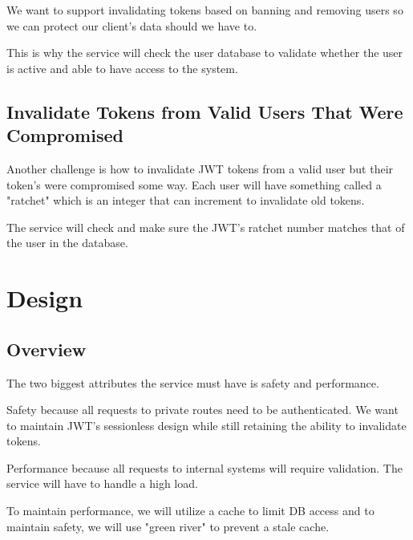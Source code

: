 \documentclass[11pt]{article}
\begin{document}
We want to support invalidating tokens based on banning and removing users so
we can protect our client's data should we have to.

This is why the service will check the user database to validate whether the
user is active and able to have access to the system.

\subsection{Invalidate Tokens from Valid Users That Were Compromised}

Another challenge is how to invalidate JWT tokens from a valid user but their
token's were compromised some way. Each user will have something called a "ratchet"
which is an integer that can increment to invalidate old tokens.

The service will check and make sure the JWT's ratchet number matches that of
the user in the database.

\section{Design}

\subsection{Overview}

The two biggest attributes the service must have is safety and performance.

Safety because all requests to private routes need to be authenticated. We want
to maintain JWT's sessionless design while still retaining the ability to invalidate
tokens.

Performance because all requests to internal systems will require validation.
The service will have to handle a high load.

To maintain performance, we will utilize a cache to limit DB access and to 
maintain safety, we will use "green river" to prevent a stale cache.

\end{document}
